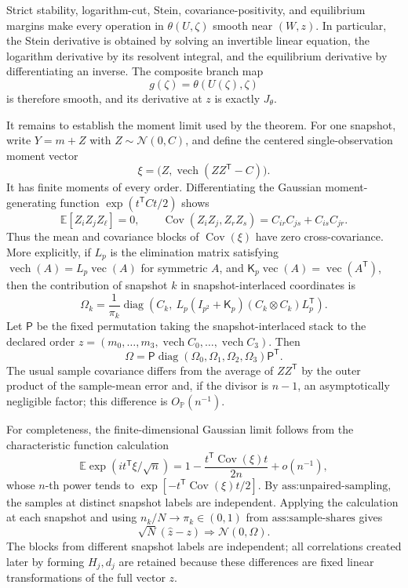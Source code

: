 Strict stability, logarithm-cut, Stein, covariance-positivity, and equilibrium margins make every operation in \(\theta(U,\zeta)\) smooth near \((W,z)\).  In particular, the Stein derivative is obtained by solving an invertible linear equation, the logarithm derivative by its resolvent integral, and the equilibrium derivative by differentiating an inverse.  The composite branch map
\[
 g(\zeta)=\theta(U(\zeta),\zeta)
\]
is therefore smooth, and its derivative at \(z\) is exactly \(J_\theta\).

It remains to establish the moment limit used by the theorem.  For one snapshot, write \(Y=m+Z\) with \(Z\sim\mathcal N(0,C)\), and define the centered single-observation moment vector
\[
 \xi=\bigl(Z,\operatorname{vech}(ZZ^{\mathsf T}-C)\bigr).
\]
It has finite moments of every order.  Differentiating the Gaussian moment-generating function \(\exp(t^{\mathsf T}Ct/2)\) shows
\[
 \mathbb E[Z_iZ_jZ_\ell]=0,
 \qquad
 \operatorname{Cov}(Z_iZ_j,Z_rZ_s)=C_{ir}C_{js}+C_{is}C_{jr}.
\]
Thus the mean and covariance blocks of \(\operatorname{Cov}(\xi)\) have zero cross-covariance.  More explicitly, if \(L_p\) is the elimination matrix satisfying \(\operatorname{vech}(A)=L_p\operatorname{vec}(A)\) for symmetric \(A\), and \(\mathsf K_p\operatorname{vec}(A)=\operatorname{vec}(A^{\mathsf T})\), then the contribution of snapshot \(k\) in snapshot-interlaced coordinates is
\[
 \Omega_k=\frac1{\pi_k}\operatorname{diag}\!\left(
 C_k,\ L_p(I_{p^2}+\mathsf K_p)(C_k\otimes C_k)L_p^{\mathsf T}\right).
\]
Let \(\mathsf P\) be the fixed permutation taking the snapshot-interlaced stack to the declared order \(z=(m_0,\ldots,m_3,\operatorname{vech}C_0,\ldots,\operatorname{vech}C_3)\).  Then
\[
 \Omega=\mathsf P\operatorname{diag}(\Omega_0,\Omega_1,\Omega_2,\Omega_3)\mathsf P^{\mathsf T}.
\]
The usual sample covariance differs from the average of \(ZZ^{\mathsf T}\) by the outer product of the sample-mean error and, if the divisor is \(n-1\), an asymptotically negligible factor; this difference is \(O_{\mathbb P}(n^{-1})\).

For completeness, the finite-dimensional Gaussian limit follows from the characteristic function calculation
\[
 \mathbb E\exp\!\left(i t^{\mathsf T}\xi/\sqrt n\right)
 =1-\frac{t^{\mathsf T}\operatorname{Cov}(\xi)t}{2n}+o(n^{-1}),
\]
whose \(n\)-th power tends to \(\exp[-t^{\mathsf T}\operatorname{Cov}(\xi)t/2]\).  By \(\text{ass:unpaired-sampling}\), the samples at distinct snapshot labels are independent.  Applying the calculation at each snapshot and using \(n_k/N\to\pi_k\in(0,1)\) from \(\text{ass:sample-shares}\) gives
\[
 \sqrt N(\widehat z-z)\Longrightarrow\mathcal N(0,\Omega).
\]
The blocks from different snapshot labels are independent; all correlations created later by forming \(H_j,d_j\) are retained because these differences are fixed linear transformations of the full vector \(z\).

